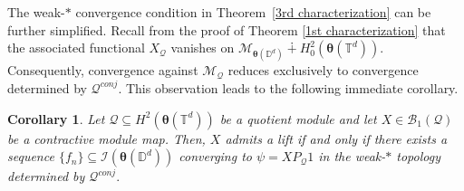 \documentclass[12pt,reqno]{amsart}
\newtheorem{corollary}[theorem]{Corollary}%
\theoremstyle{remark}
\theoremstyle{definition}
\def \z{\boldsymbol{z}}
\def \\theta{\boldsymbol{\theta}}
\def \\xi{\boldsymbol{\xi}}
\begin{document}
The weak-$*$ convergence condition in Theorem~\ref{3rd characterization} can be further simplified. 
Recall from the proof of Theorem \ref{1st characterization} that the associated functional $X_{\mathcal{Q}}$ vanishes on $\mathcal{M}_{\boldsymbol \theta(\mathbb D^d)}\dotplus H^2_0(\boldsymbol \theta(\mathbb T^d)).$  
Consequently, convergence against $\mathcal{M}_{\mathcal{Q}}$  reduces exclusively to convergence determined by $\mathcal{Q}^{conj}.$ 
This observation leads to the following immediate corollary. 
\begin{corollary}\label{refined characterization}
    Let $\mathcal{Q} \subseteq H^2(\boldsymbol \theta(\mathbb T^d))$ be a quotient module and let $X\in \mathcal{B}_1(\mathcal{Q})$ be a contractive module map. Then, $X$ admits a lift if and only if there exists a sequence $\{f_n\}\subseteq \mathcal{I}(\boldsymbol \theta(\mathbb D^d))$ converging to $\psi=XP_{\mathcal{Q}}1$ in the weak-$*$ topology determined by $\mathcal{Q}^{conj}.$
\end{corollary}















\end{document}
